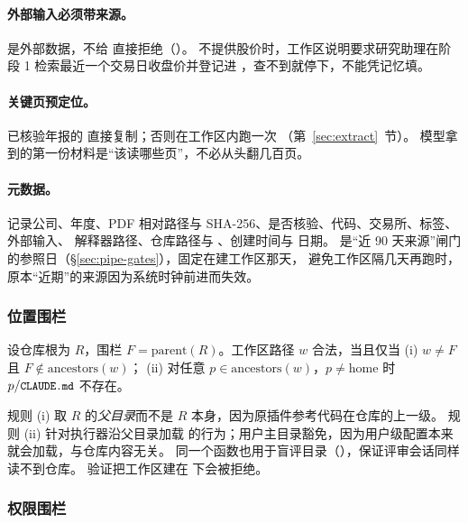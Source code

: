 \paragraph{外部输入必须带来源。} 是外部数据，不给  直接拒绝（）。
不提供股价时，工作区说明要求研究助理在阶段 1 检索最近一个交易日收盘价并登记进 ，查不到就停下，不能凭记忆填。

\paragraph{关键页预定位。}已核验年报的  直接复制；否则在工作区内跑一次 （第~\ref{sec:extract}~节）。
模型拿到的第一份材料是“该读哪些页”，不必从头翻几百页。

\paragraph{元数据。} 记录公司、年度、PDF 相对路径与 SHA-256、是否核验、代码、交易所、标签、外部输入、
解释器路径、仓库路径与 、创建时间与  日期。
 是“近 90 天来源”闸门的参照日（\S\ref{sec:pipe-gates}），固定在建工作区那天，
避免工作区隔几天再跑时，原本“近期”的来源因为系统时钟前进而失效。

\subsubsection{位置围栏}

\begin{definition}[位置围栏]\label{def:pipe-fence}
设仓库根为 $R$，围栏 $F=\mathrm{parent}(R)$。工作区路径 $w$ 合法，当且仅当
(i) $w\neq F$ 且 $F\notin\mathrm{ancestors}(w)$；
(ii) 对任意 $p\in\mathrm{ancestors}(w)$，$p\neq \mathrm{home}$ 时 $p/\texttt{\small CLAUDE.md}$ 不存在。
\end{definition}

规则 (i) 取 $R$ 的\emph{父目录}而不是 $R$ 本身，因为原插件参考代码在仓库的上一级。
规则 (ii) 针对执行器沿父目录加载  的行为；用户主目录豁免，因为用户级配置本来就会加载，与仓库内容无关。
同一个函数也用于盲评目录（），保证评审会话同样读不到仓库。
 验证把工作区建在  下会被拒绝。

\subsubsection{权限围栏}

